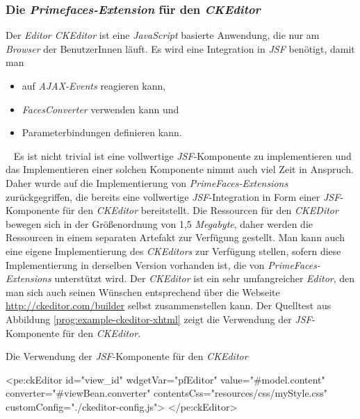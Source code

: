 \subsubsection{Die \emph{Primefaces-Extension} für den \emph{CKEditor}}
Der \emph{Editor CKEditor} ist eine \emph{JavaScript} basierte Anwendung, die nur am \emph{Browser} der BenutzerInnen läuft. Es wird eine Integration in \emph{JSF} benötigt, damit man
\begin{itemize}
	\item auf \emph{AJAX-Events} reagieren kann,
	\item\emph{FacesConverter} verwenden kann und
	\item Parameterbindungen definieren kann.
\end{itemize}
\ \newline
Es ist nicht trivial ist eine vollwertige \emph{JSF}-Komponente zu implementieren und das Implementieren einer solchen Komponente nimmt auch viel Zeit in Anspruch. Daher wurde auf die Implementierung von \emph{PrimeFaces-Extensions} zurückgegriffen, die bereits eine vollwertige \emph{JSF}-Integration in Form einer \emph{JSF}-Komponente für den \emph{CKEditor} bereitstellt.
\newline
\newline
Die Ressourcen für den \emph{CKEDitor} bewegen sich in der Größenordnung von 1,5 \emph{Megabyte}, daher werden die Ressourcen in einem separaten Artefakt zur Verfügung gestellt. Man kann auch eine eigene Implementierung des \emph{CKEditors} zur Verfügung stellen, sofern diese Implementierung in derselben Version vorhanden ist, die von \emph{PrimeFaces-Extensions} unterstützt wird. Der \emph{CKEditor} ist ein sehr umfangreicher \emph{Editor}, den man sich auch seinen Wünschen entsprechend über die Webseite \url{http://ckeditor.com/builder} selbst zusammenstellen kann.
\newline
\newline
Der Quelltest aus Abbildung \ref{prog:example-ckeditor-xhtml} zeigt die Verwendung der \emph{JSF}-Komponente für den \emph{CKEditor}.
\begin{program}[h]
\caption{Die Verwendung der \emph{JSF}-Komponente für den \emph{CKEditor}}
\label{prog:example-ckeditor-xhtml}
\begin{HtmlCode}
<pe:ckEditor id="view_id"
             wdgetVar="pfEditor"
             value="#{model.content}"
             converter="#{viewBean.converter}" 
             contentsCss="resources/css/myStyle.css"
             customConfig="./ckeditor-config.js">
</pe:ckEditor>
\end{HtmlCode}
\end{program}
